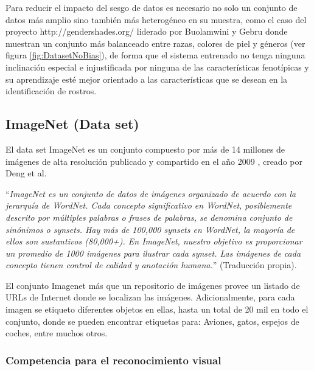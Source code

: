         Para reducir el impacto del sesgo de datos es necesario no solo un conjunto de datos más amplio sino también más heterogéneo en su muestra, como el caso del proyecto {http://gendershades.org/} liderado por Buolamwini y Gebru \cite{Buolamwini2018Sesgo} donde muestran un conjunto más balanceado entre razas, colores de piel y géneros (ver figura \ref{fig:DatasetNoBias}), de forma que el sistema entrenado no tenga ninguna inclinación especial e injustificada por ninguna de las características fenotípicas y su aprendizaje esté mejor orientado a las características que se desean en la identificación de rostros.
        
    
    
    \subsection{ImageNet (Data set)}
    \label{sub:FrameImageNet}
    
        El data set ImageNet es un conjunto compuesto por más de 14 millones de imágenes de alta resolución publicado y compartido en el año 2009 \cite{ImageNet2009}, creado por Deng et al.
        
        ``\textit{ImageNet es un conjunto de datos de imágenes organizado de acuerdo con la jerarquía de WordNet. Cada concepto significativo en WordNet, posiblemente descrito por múltiples palabras o frases de palabras, se denomina conjunto de sinónimos o synsets. Hay más de 100,000 synsets en WordNet, la mayoría de ellos son sustantivos (80,000+). En ImageNet, nuestro objetivo es proporcionar un promedio de 1000 imágenes para ilustrar cada synset. Las imágenes de cada concepto tienen control de calidad y anotación humana.}'' \cite{Imagenet2020Home} (Traducción propia).
        
        El conjunto Imagenet más que un repositorio de imágenes provee un listado de URLs de Internet donde se localizan las imágenes. Adicionalmente, para cada imagen se etiqueto diferentes objetos en ellas, hasta un total de 20 mil en todo el conjunto, donde se pueden encontrar etiquetas para: Aviones, gatos, espejos de coches, entre muchos otros.
        
        \subsubsection{Competencia para el reconocimiento visual}
        
